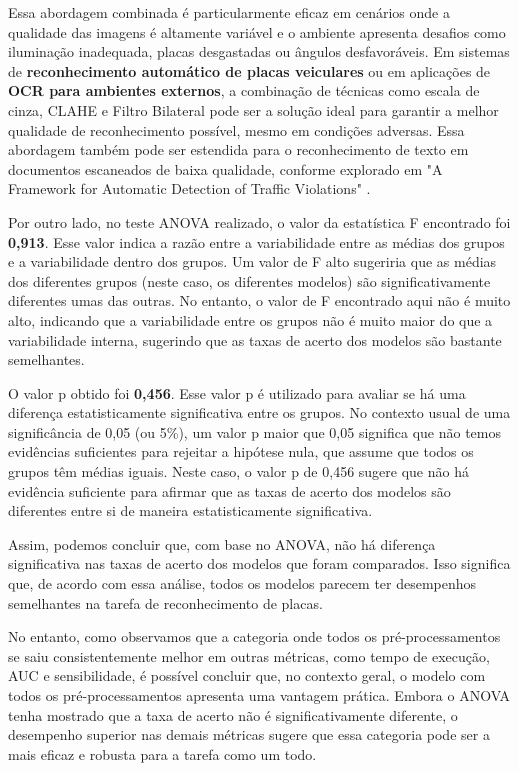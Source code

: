 \documentclass[conference]{IEEEtran}
\begin{document}
Essa abordagem combinada é particularmente eficaz em cenários onde a qualidade das imagens é altamente variável e o ambiente apresenta desafios como iluminação inadequada, placas desgastadas ou ângulos desfavoráveis. Em sistemas de \textbf{reconhecimento automático de placas veiculares} ou em aplicações de \textbf{OCR para ambientes externos}, a combinação de técnicas como escala de cinza, CLAHE e Filtro Bilateral pode ser a solução ideal para garantir a melhor qualidade de reconhecimento possível, mesmo em condições adversas. Essa abordagem também pode ser estendida para o reconhecimento de texto em documentos escaneados de baixa qualidade, conforme explorado em "A Framework for Automatic Detection of Traffic Violations" \cite{b12}.

Por outro lado, no teste ANOVA realizado, o valor da estatística F encontrado foi \textbf{0,913}. Esse valor indica a razão entre a variabilidade entre as médias dos grupos e a variabilidade dentro dos grupos. Um valor de F alto sugeriria que as médias dos diferentes grupos (neste caso, os diferentes modelos) são significativamente diferentes umas das outras. No entanto, o valor de F encontrado aqui não é muito alto, indicando que a variabilidade entre os grupos não é muito maior do que a variabilidade interna, sugerindo que as taxas de acerto dos modelos são bastante semelhantes.

O valor p obtido foi \textbf{0,456}. Esse valor p é utilizado para avaliar se há uma diferença estatisticamente significativa entre os grupos. No contexto usual de uma significância de 0,05 (ou 5\%), um valor p maior que 0,05 significa que não temos evidências suficientes para rejeitar a hipótese nula, que assume que todos os grupos têm médias iguais. Neste caso, o valor p de 0,456 sugere que não há evidência suficiente para afirmar que as taxas de acerto dos modelos são diferentes entre si de maneira estatisticamente significativa.

Assim, podemos concluir que, com base no ANOVA, não há diferença significativa nas taxas de acerto dos modelos que foram comparados. Isso significa que, de acordo com essa análise, todos os modelos parecem ter desempenhos semelhantes na tarefa de reconhecimento de placas.

No entanto, como observamos que a categoria onde todos os pré-processamentos se saiu consistentemente melhor em outras métricas, como tempo de execução, AUC e sensibilidade, é possível concluir que, no contexto geral, o modelo com todos os pré-processamentos apresenta uma vantagem prática. Embora o ANOVA tenha mostrado que a taxa de acerto não é significativamente diferente, o desempenho superior nas demais métricas sugere que essa categoria pode ser a mais eficaz e robusta para a tarefa como um todo.
\end{document}
